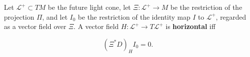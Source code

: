 Let $\mathcal{L}^+ \subset TM$ be the future light cone, let $\Xi: \mathcal{L}^+ \to M$ be the restriction of the projection $\Pi$, and let $I_0$ be the restriction of the identity map $I$ to $\mathcal{L}^+$, regarded as a vector field over $\Xi$. A vector field $H: \mathcal{L}^+ \to T\mathcal{L}^+$ is \textbf{horizontal} iff

$$(\Xi^* D)_H I_0 = 0.$$
